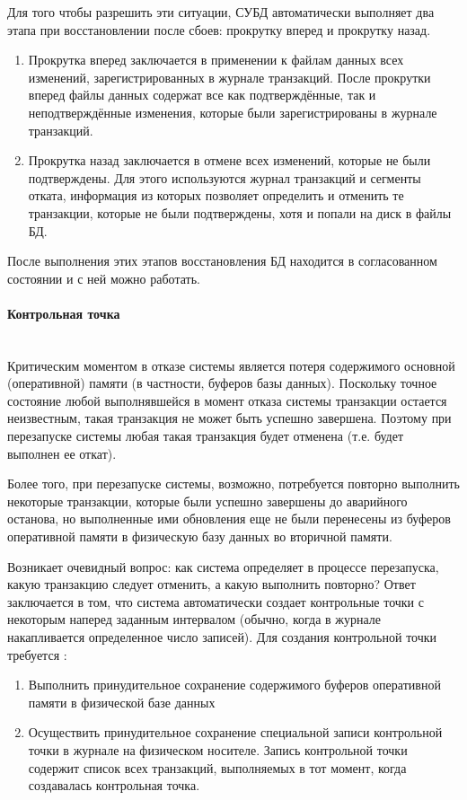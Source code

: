 Для того чтобы разрешить эти ситуации, СУБД автоматически выполняет два этапа при восстановлении после сбоев: прокрутку вперед и прокрутку назад.

\begin{enumerate}
    \item Прокрутка вперед заключается в применении к файлам данных всех изменений, зарегистрированных в журнале транзакций. После прокрутки вперед файлы данных содержат все как подтверждённые, так и неподтверждённые изменения, которые были зарегистрированы в журнале транзакций.
    \item Прокрутка назад заключается в отмене всех изменений, которые не были подтверждены. Для этого используются журнал транзакций и сегменты отката, информация из которых позволяет определить и отменить те транзакции, которые не были подтверждены, хотя и попали на диск в файлы БД.
\end{enumerate}

После выполнения этих этапов восстановления БД находится в согласованном состоянии и с ней можно работать.

\paragraph{Контрольная точка} ~\\

Критическим моментом в отказе системы является потеря содержимого основной (оперативной) памяти (в частности, буферов базы данных). Поскольку точное состояние любой выполнявшейся в момент отказа системы транзакции остается неизвестным, такая транзакция не может быть успешно завершена. Поэтому при перезапуске системы любая такая транзакция будет отменена (т.е. будет выполнен ее откат). 


Более того, при перезапуске системы, возможно, потребуется повторно выполнить некоторые транзакции, которые были успешно завершены до аварийного останова, но выполненные ими обновления еще не были перенесены из буферов оперативной памяти в физическую базу данных во вторичной памяти.


Возникает очевидный вопрос: как система определяет в процессе перезапуска, какую транзакцию следует отменить, а какую выполнить повторно? Ответ заключается в том, что система автоматически создает контрольные точки с некоторым наперед заданным интервалом (обычно, когда в журнале накапливается определенное число записей). Для создания контрольной точки требуется \autocite{Date2005}:

\begin{enumerate}
    \item Выполнить принудительное сохранение содержимого буферов оперативной памяти в физической базе данных 
    \item Осуществить принудительное сохранение специальной записи контрольной точки в журнале на физическом носителе. Запись контрольной точки содержит список всех транзакций, выполняемых в тот момент, когда создавалась контрольная точка.
\end{enumerate}

